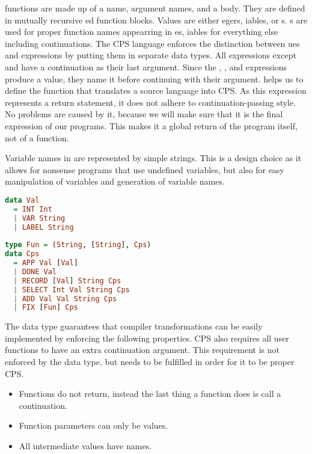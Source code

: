 { functions are made up of a name, argument names, and a body. They are defined in mutually recursive ed function blocks. Values are either egers, iables, or s. s are used for proper function names appearring in es, iables for everything else including continuations. The CPS language enforces the distinction between ues and  expressions by putting them in separate data types. All expressions except  and  have a  continuation as their last argument. Since the , , and  expressions produce a value, they name it before continuing with their  argument.  helps us to define the function that translates a source language into CPS. As this expression represents a return statement, it does not adhere to continuation-passing style. No problems are caused by it, because we will make sure that it is the final expression of our programs. This makes it a global return of the program itself, not of a function.

Variable names in  are represented by simple strings. This is a design choice as it allows for nonsense programs that use undefined variables, but also for easy manipulation of variables and generation of variable names.

\begin{lstlisting}[language=Haskell]
data Val
  = INT Int
  | VAR String
  | LABEL String
  
type Fun = (String, [String], Cps)
data Cps
  = APP Val [Val]
  | DONE Val
  | RECORD [Val] String Cps
  | SELECT Int Val String Cps
  | ADD Val Val String Cps
  | FIX [Fun] Cps
\end{lstlisting}

The  data type guarantees that compiler transformations can be easily implemented by enforcing the following properties. CPS also requires all user functions to have an extra continuation argument. This requirement is not enforced by the data type, but needs to be fulfilled in order for it to be proper CPS.

\begin{itemize}
\item Functions do not return, instead the last thing a function does is call a continuation.
\item Function parameters can only be values.
\item All intermediate values have names.
\end{itemize}

}
